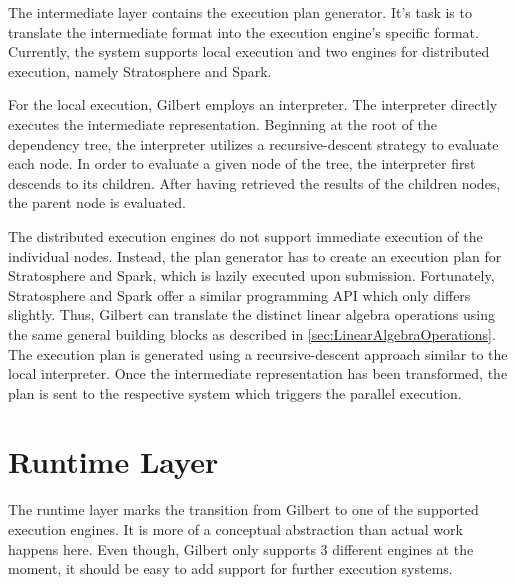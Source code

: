 The intermediate layer contains the execution plan generator.
It's task is to translate the intermediate format into the execution engine's specific format.
Currently, the system supports local execution and two engines for distributed execution, namely Stratosphere and Spark.

For the local execution, Gilbert employs an interpreter.
The interpreter directly executes the intermediate representation.
Beginning at the root of the dependency tree, the interpreter utilizes a recursive-descent strategy to evaluate each node.
In order to evaluate a given node of the tree, the interpreter first descends to its children.
After having retrieved the results of the children nodes, the parent node is evaluated.

The distributed execution engines do not support immediate execution of the individual nodes.
Instead, the plan generator has to create an execution plan for Stratosphere and Spark, which is lazily executed upon submission.
Fortunately, Stratosphere and Spark offer a similar programming API which only differs slightly.
Thus, Gilbert can translate the distinct linear algebra operations using the same general building blocks as described in \cref{sec:LinearAlgebraOperations}.
The execution plan is generated using a recursive-descent approach similar to the local interpreter.
Once the intermediate representation has been transformed, the plan is sent to the respective system which triggers the parallel execution.

\section{Runtime Layer}

The runtime layer marks the transition from Gilbert to one of the supported execution engines.
It is more of a conceptual abstraction than actual work happens here.
Even though, Gilbert only supports 3 different engines at the moment, it should be easy to add support for further execution systems.
